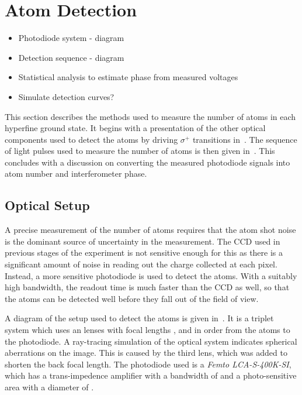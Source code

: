 \section{Atom Detection}\label{sec:atom_detection} 
\begin{itemize} 
  \item Photodiode system - diagram 
  \item Detection sequence - diagram 
  \item Statistical analysis to estimate phase from measured voltages 
  \item Simulate detection curves?  
\end{itemize} 
This section describes the methods used to
measure the number of atoms in each hyperfine ground state. It begins with a
presentation of the other optical components used to detect the atoms by
driving \(\sigma^+\) transitions in~.
The sequence of light pulses used to measure the number of atoms is then
given in~. This concludes with a
discussion on converting the measured photodiode signals into atom
number and interferometer phase.
\subsection{Optical Setup}\label{subsec:optical_setup}
A precise measurement of the number of atoms requires that the atom shot noise
is the dominant source of uncertainty in the measurement. The CCD used in
previous stages of the experiment is not sensitive enough for this as there is a
significant amount of noise in reading out the charge collected at each pixel.
Instead, a more sensitive photodiode is used to detect the atoms. With a
suitably high bandwidth, the readout time is much faster than the CCD as well,
so that the atoms can be detected well before they fall out of the field of
view. \par\noindent A diagram of the setup used to detect the atoms is given
in~. It is a triplet system which uses an
lenses with focal lengths ,
 and  in order from the
atoms to the photodiode.  A ray-tracing simulation of the optical system indicates spherical aberrations on the image. This is caused by the third lens, which was added to shorten the back focal length. The photodiode used is a \textit{Femto LCA-S-400K-SI},
which has a trans-impedence amplifier with a bandwidth of  and a photo-sensitive area
with a diameter of . 
